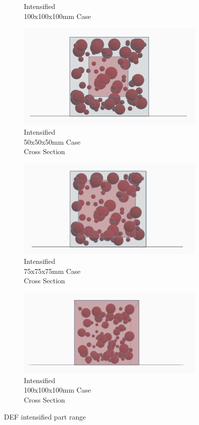 \begin{figure}[ht]
\begin{subfigure}{.33\textwidth}
      \caption{Intensified  \\ 100x100x100mm Case}
    \end{subfigure}
    \begin{subfigure}{.33\textwidth}
      \centering
      \includegraphics[width=.8\linewidth]{Files/DEF_X/X0_3ds.png}
      \caption{Intensified  \\ 50x50x50mm Case\\ Cross Section}
    \end{subfigure}%
    \begin{subfigure}{.33\textwidth}
      \centering
      \includegraphics[width=.8\linewidth]{Files/DEF_X/X-5_3ds.png}
      \caption{Intensified \\  75x75x75mm Case \\ Cross Section}
    \end{subfigure}%
    \begin{subfigure}{.33\textwidth}
      \centering
      \includegraphics[width=.9\linewidth]{Files/DEF_X/X-1_3ds.png}
      \caption{Intensified  \\ 100x100x100mm Case\\ Cross Section}
    \end{subfigure}
  \caption{DEF intensified part range}
  \label{fig:DEF_X}
\end{figure}

